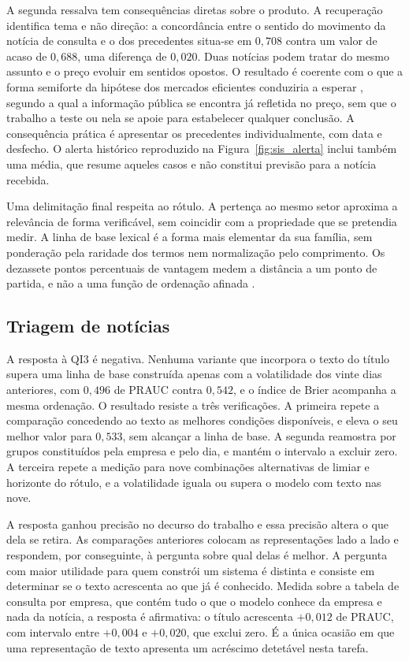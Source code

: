 A segunda ressalva tem consequências diretas sobre o produto. A recuperação identifica tema e não
direção: a concordância entre o sentido do movimento da notícia de consulta e o dos precedentes
situa-se em $0{,}708$ contra um valor de acaso de $0{,}688$, uma diferença de $0{,}020$. Duas
notícias podem tratar do mesmo assunto e o preço evoluir em sentidos opostos. O resultado é
coerente com o que a forma semiforte da hipótese dos mercados eficientes conduziria a esperar
\autocite{fama1970efficient}, segundo a qual a informação pública se encontra já refletida no preço,
sem que o trabalho a teste ou nela se apoie para estabelecer qualquer conclusão. A consequência
prática é apresentar os precedentes individualmente, com data e desfecho. O alerta histórico
reproduzido na Figura~\ref{fig:sis_alerta} inclui também uma média, que resume aqueles casos e
não constitui previsão para a notícia recebida.

Uma delimitação final respeita ao rótulo. A pertença ao mesmo setor aproxima a relevância de forma
verificável, sem coincidir com a propriedade que se pretendia medir. A linha de base lexical é a forma mais elementar da sua família, sem ponderação pela raridade dos
termos nem normalização pelo comprimento. Os dezassete pontos percentuais de vantagem medem a
distância a um ponto de partida, e não a uma função de ordenação afinada
\autocite{robertson2009bm25}.

\subsection{Triagem de notícias}

A resposta à \gls{QI}3 é negativa. Nenhuma variante que incorpora o texto do título supera uma linha
de base construída apenas com a volatilidade dos vinte dias anteriores, com $0{,}496$ de \gls{PRAUC}
contra $0{,}542$, e o índice de Brier acompanha a mesma ordenação. O resultado resiste a três verificações. A primeira repete a comparação concedendo ao texto as
melhores condições disponíveis, e eleva o seu melhor valor para $0{,}533$, sem alcançar a linha de
base. A segunda reamostra por grupos constituídos pela empresa e pelo dia, e mantém o intervalo a
excluir zero. A terceira repete a medição para nove combinações alternativas de limiar e horizonte
do rótulo, e a volatilidade iguala ou supera o modelo com texto nas nove.

A resposta ganhou precisão no decurso do trabalho e essa precisão altera o que dela se retira. As
comparações anteriores colocam as representações lado a lado e respondem, por conseguinte, à pergunta
sobre qual delas é melhor. A pergunta com maior utilidade para quem constrói um sistema é distinta e
consiste em determinar se o texto acrescenta ao que já é conhecido. Medida sobre a tabela de consulta
por empresa, que contém tudo o que o modelo conhece da empresa e nada da notícia, a resposta é
afirmativa: o título acrescenta $+0{,}012$ de \gls{PRAUC}, com intervalo entre $+0{,}004$ e
$+0{,}020$, que exclui zero. É a única ocasião em que uma representação de texto apresenta um
acréscimo detetável nesta tarefa.


